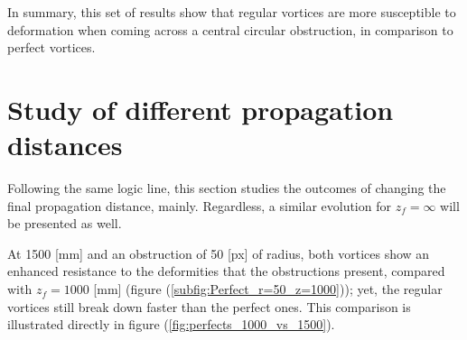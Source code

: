 In summary, this set of results show that regular vortices are more susceptible to deformation when coming across a central circular obstruction, in comparison to perfect vortices.

\section{Study of different propagation distances}
\label{c4:z_f variations}

Following the same logic line, this section studies the outcomes of changing the final propagation distance, mainly. Regardless, a similar evolution for $z_f = \infty$ will be presented as well. 

At 1500 [mm] and an obstruction of 50 [px] of radius, both vortices show an enhanced resistance to the deformities that the obstructions present, compared with $z_f = 1000$ [mm] (figure (\ref{subfig:Perfect_r=50_z=1000})); yet, the regular vortices still break down faster than the perfect ones. This comparison is illustrated directly in figure (\ref{fig:perfects_1000_vs_1500}).

